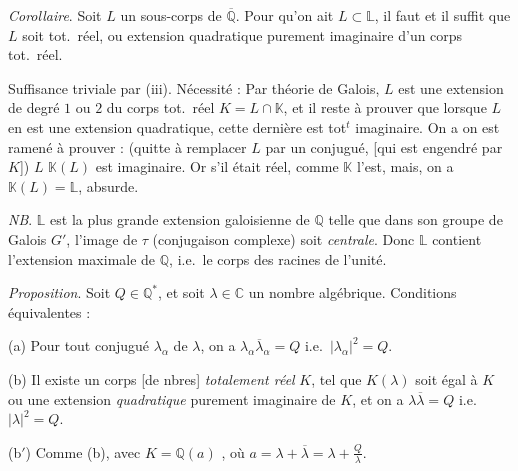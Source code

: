\documentclass[11pt,a4paper]{article}
\begin{document}
\emph{Corollaire}. Soit $L$ un \struck{\ill{}} sous-corps de
$\overline{\mathbb{Q}}$. Pour qu'on ait $L \subset \mathbb{L}$, il faut et il
suffit que $L$ soit tot.\ réel, ou extension quadratique purement imaginaire
d'un corps tot.\ réel.



Suffisance triviale par (iii). Nécessité : Par théorie de Galois, $L$ est une
extension de degré $1$ ou $2$ du corps tot.\ réel $K = L \cap \mathbb{K}$, et il
reste à prouver que lorsque $L$ en est une extension quadratique, cette
dernière est tot$^{t}$ imaginaire. \struck{\ill{}} On a \struck{\ill{}} on est
ramené à prouver :  (quitte à remplacer $L$ par un conjugué,
[qui est engendré par $K$]) \ill{} $L$ \ill{} $\mathbb{K}(L)$ est imaginaire.
Or s'il était réel, comme $\mathbb{K}$ l'est, \ill{} mais, on a
$\mathbb{K}(L) = \mathbb{L}$, absurde.

\emph{NB}. $\mathbb{L}$ est la plus grande extension galoisienne de
$\mathbb{Q}$ telle que dans son groupe de Galois $G'$, l'image de $\tau$
(conjugaison complexe) soit \emph{centrale}. Donc $\mathbb{L}$ contient
l'extension  maximale de $\mathbb{Q}$, i.e.\ le corps des
racines de l'unité.

\emph{Proposition}. Soit $Q \in \mathbb{Q}^{*}$, et soit $\lambda \in \mathbb{C}$
un nombre algébrique. Conditions équivalentes :

(a) Pour tout conjugué $\lambda_{\alpha}$ de $\lambda$, on a
$\lambda_{\alpha}\overline{\lambda}_{\alpha} = Q$ i.e.\ $|\lambda_{\alpha}|^{2}
= Q$.

(b) \struck{\ill{}} Il existe un corps [de nbres] \emph{totalement réel} $K$,
tel que \struck{\ill{}} $K(\lambda)$ soit égal à $K$ ou une extension
\emph{quadratique} purement imaginaire de $K$, et on a
$\lambda\overline{\lambda} = Q$ i.e.\ $|\lambda|^{2} = Q$.

(b$'$) Comme (b), avec $K = \mathbb{Q}(a)$ \struck{\ill{}}, où $a = \lambda +
\overline{\lambda} = \lambda + \frac{Q}{\lambda}$.
\end{document}

